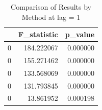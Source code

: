 \begin{table}
\caption{Comparison of Results by Method at lag = 1}
\label{tab:results_by_method}
\begin{tabular}{lrr}
\toprule
 & F\_statistic & p\_value \\
\midrule
0 & 184.222067 & 0.000000 \\
0 & 155.271462 & 0.000000 \\
0 & 133.568069 & 0.000000 \\
0 & 131.793845 & 0.000000 \\
0 & 13.861952 & 0.000198 \\
\bottomrule
\end{tabular}
\end{table}
